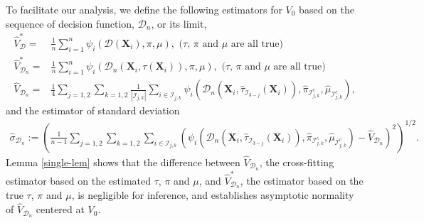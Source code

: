 \documentclass[11pt]{article}
\theoremstyle{referenceplain}
\theoremstyle{referencedefinition}
\theoremstyle{referenceremark}
\begin{document}
To facilitate our analysis, we define the following estimators for $V_0$ based on the sequence of decision function, $\mathcal{D}_n$, or its limit,
\begin{align}
\widehat{V}_{\mathcal{D}}^*=&\frac{1}{n}\sum_{i=1}^n \psi_i(\mathcal{D}(\mathbf{X}_i),\pi,\mu),\text{ ($\tau$, $\pi$ and $\mu$ are all true)}\\
\widehat{V}_{\mathcal{D}_n}^*=&\frac{1}{n}\sum_{i=1}^n \psi_i(\mathcal{D}_n(\mathbf{X}_i,\tau(\mathbf{X}_i)),\pi,\mu),\text{ ($\tau$, $\pi$ and $\mu$ are all true)}\label{VD_oracle}\\
    \widehat{V}_{\mathcal{D}_n}=&\frac{1}{4}\sum_{j=1,2}\sum_{k=1,2}\frac{1}{|\mathcal{I}_{j,k}|}\sum_{i\in\mathcal{I}_{j,k}}\psi_i(\mathcal{D}_n(\mathbf{X}_i,\widehat{\tau}_{\mathcal{I}_{3-j}}(\mathbf{X}_i)),\widehat{\pi}_{\mathcal{I}_{j,k}^c},\widehat{\mu}_{\mathcal{I}_{j,k}^c})\label{VD},
\end{align}
and the estimator of standard deviation
\begin{align*}
    \widehat{\sigma}_{\mathcal{D}_n}:=\left(\frac{1}{n-1}\sum_{j=1,2}\sum_{k=1,2}\sum_{i\in\mathcal{I}_{j,k}}\left(\psi_i(\mathcal{D}_n(\mathbf{X}_i,\widehat{\tau}_{\mathcal{I}_{3-j}}(\mathbf{X}_i)),\widehat{\pi}_{\mathcal{I}_{j,k}^c},\widehat{\mu}_{\mathcal{I}_{j,k}^c})- \widehat{V}_{\mathcal{D}_n}\right)^2\right)^{1/2}.
\end{align*}
Lemma \ref{single-lem} shows that the difference between $\widehat{V}_{\mathcal{D}_n}$, the cross-fitting estimator based on the estimated $\tau$, $\pi$ and $\mu$, and $\widehat{V}_{\mathcal{D}_n}^*$, the estimator based on the true $\tau$, $\pi$ and $\mu$, is negligible for inference, and establishes asymptotic normality of $\widehat{V}_{\mathcal{D}_n}$ centered at $V_0$. 
\end{document}
